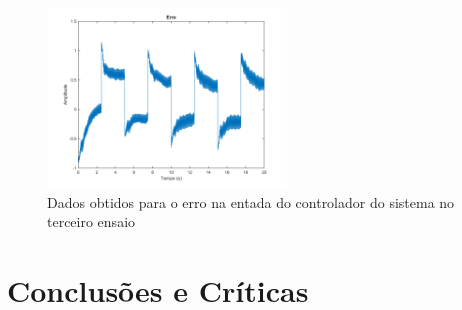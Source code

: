 \documentclass[%
  reprint,
  nofootinbib,
  amsmath,amssymb,
  aps,
  10pt,
  a4paper
]{revtex4-1}
\begin{document}
\begin{figure}
\includegraphics[width=2.5in]{../imgs/dados_00_g/dados_00_g_err.png}
\caption{Dados obtidos para o erro na entada do controlador do sistema no terceiro ensaio}
\label{fig:erro}
\end{figure}
\label{s:conclu}
\section{Conclusões e Críticas}



\nocite{}
{}
\end{document}
